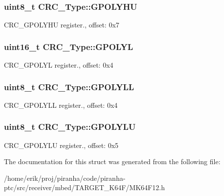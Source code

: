 \subsubsection[{\texorpdfstring{G\+P\+O\+L\+Y\+HU}{GPOLYHU}}]{ uint8\+\_\+t C\+R\+C\+\_\+\+Type\+::\+G\+P\+O\+L\+Y\+HU}\hypertarget{structCRC__Type_ad586e99f91c56b8b7ff3c66cdd49532e}{}\label{structCRC__Type_ad586e99f91c56b8b7ff3c66cdd49532e}
C\+R\+C\+\_\+\+G\+P\+O\+L\+Y\+HU register., offset\+: 0x7 
\subsubsection[{\texorpdfstring{G\+P\+O\+L\+YL}{GPOLYL}}]{ uint16\+\_\+t C\+R\+C\+\_\+\+Type\+::\+G\+P\+O\+L\+YL}\hypertarget{structCRC__Type_aae78053e4972b46bf73418b5ddf528c6}{}\label{structCRC__Type_aae78053e4972b46bf73418b5ddf528c6}
C\+R\+C\+\_\+\+G\+P\+O\+L\+YL register., offset\+: 0x4 
\subsubsection[{\texorpdfstring{G\+P\+O\+L\+Y\+LL}{GPOLYLL}}]{ uint8\+\_\+t C\+R\+C\+\_\+\+Type\+::\+G\+P\+O\+L\+Y\+LL}\hypertarget{structCRC__Type_a562fe07580c6a518f75310b77a7a707a}{}\label{structCRC__Type_a562fe07580c6a518f75310b77a7a707a}
C\+R\+C\+\_\+\+G\+P\+O\+L\+Y\+LL register., offset\+: 0x4 
\subsubsection[{\texorpdfstring{G\+P\+O\+L\+Y\+LU}{GPOLYLU}}]{ uint8\+\_\+t C\+R\+C\+\_\+\+Type\+::\+G\+P\+O\+L\+Y\+LU}\hypertarget{structCRC__Type_ab6dcfd8d1a96cd746edfccf4b609bfc2}{}\label{structCRC__Type_ab6dcfd8d1a96cd746edfccf4b609bfc2}
C\+R\+C\+\_\+\+G\+P\+O\+L\+Y\+LU register., offset\+: 0x5 

The documentation for this struct was generated from the following file\+:\begin{DoxyCompactItemize}
\item 
/home/erik/proj/piranha/code/piranha-\/ptc/src/receiver/mbed/\+T\+A\+R\+G\+E\+T\+\_\+\+K64\+F/M\+K64\+F12.\+h\end{DoxyCompactItemize}
